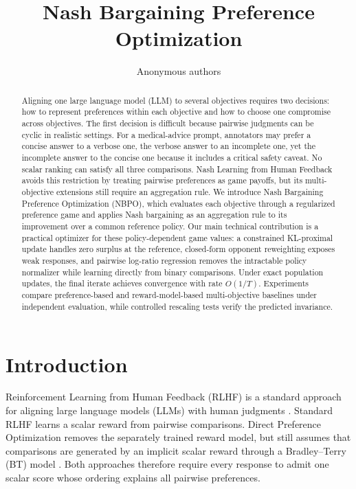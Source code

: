 \documentclass{article}
\title{Nash Bargaining Preference Optimization}
\author{Anonymous authors}
\theoremstyle{remark}
\theoremstyle{plain}
\newcommand{\NBPO}{\textsc{NBPO}}
\begin{document}
\maketitle

\begin{abstract}
Aligning one large language model (LLM) to several objectives requires two decisions: how to represent preferences within each objective and how to choose one compromise across objectives. The first decision is difficult because pairwise judgments can be cyclic in realistic settings. For a medical-advice prompt, annotators may prefer a concise answer to a verbose one, the verbose answer to an incomplete one, yet the incomplete answer to the concise one because it includes a critical safety caveat. No scalar ranking can satisfy all three comparisons. Nash Learning from Human Feedback avoids this restriction by treating pairwise preferences as game payoffs, but its multi-objective extensions still require an aggregation rule. We introduce Nash Bargaining Preference Optimization (\NBPO{}), which evaluates each objective through a regularized preference game and applies Nash bargaining as an aggregation rule to its improvement over a common reference policy. Our main technical contribution is a practical optimizer for these policy-dependent game values: a constrained KL-proximal update handles zero surplus at the reference, closed-form opponent reweighting exposes weak responses, and pairwise log-ratio regression removes the intractable policy normalizer while learning directly from binary comparisons. Under exact population updates, the final iterate achieves convergence with rate $O(1/T)$. Experiments compare preference-based and reward-model-based multi-objective baselines under independent evaluation, while controlled rescaling tests verify the predicted invariance.
\end{abstract}

\section{Introduction}
\label{sec:intro}
Reinforcement Learning from Human Feedback (RLHF) is a standard approach for aligning large language models (LLMs) with human judgments \citep{christiano2017deep,ouyang2022training}. Standard RLHF learns a scalar reward from pairwise comparisons. Direct Preference Optimization removes the separately trained reward model, but still assumes that comparisons are generated by an implicit scalar reward through a Bradley--Terry (BT) model \citep{rafailov2023direct,bradley1952rank}. Both approaches therefore require every response to admit one scalar score whose ordering explains all pairwise preferences.
\end{document}
